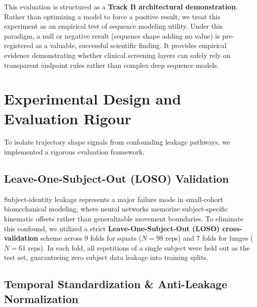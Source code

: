 This evaluation is structured as a \textbf{Track B architectural demonstration}. Rather than optimizing a model to force a positive result, we treat this experiment as an empirical test of sequence modeling utility. Under this paradigm, a null or negative result (sequence shape adding no value) is pre-registered as a valuable, successful scientific finding. It provides empirical evidence demonstrating whether clinical screening layers can safely rely on transparent endpoint rules rather than complex deep sequence models.



\section{Experimental Design and Evaluation Rigour}
\label{sec:13-2-experimental-design-and-evaluation-rigour}


To isolate trajectory shape signals from confounding leakage pathways, we implemented a rigorous evaluation framework.

\subsection{Leave-One-Subject-Out (LOSO) Validation}
\label{sec:13-2-1-leave-one-subject-out-loso-validation}

Subject-identity leakage represents a major failure mode in small-cohort biomechanical modeling, where neural networks memorize subject-specific kinematic offsets rather than generalizable movement boundaries. To eliminate this confound, we utilized a strict \textbf{Leave-One-Subject-Out (LOSO) cross-validation} scheme across 9 folds for squats ($N=98$ reps) and 7 folds for lunges ($N=61$ reps). In each fold, all repetitions of a single subject were held out as the test set, guaranteeing zero subject data leakage into training splits.

\subsection{Temporal Standardization \& Anti-Leakage Normalization}
\label{sec:13-2-2-temporal-standardization-anti-leakage-normalization}

